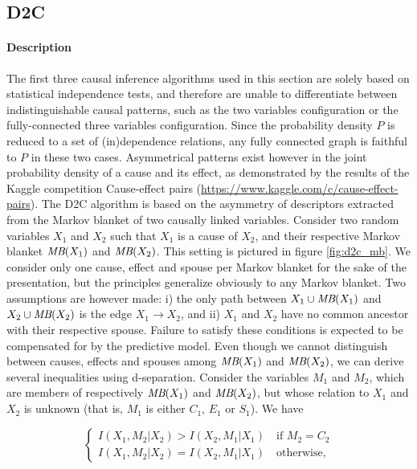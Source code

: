 \subsection{D2C}

\paragraph{Description} The first three causal inference algorithms used in this
section are solely based on statistical independence tests, and therefore are
unable to differentiate between indistinguishable causal patterns, such as the
two variables configuration or the fully-connected three variables
configuration. Since the probability density $P$ is reduced to a set of
(in)dependence relations, any fully connected graph is faithful to $P$ in these
two cases. Asymmetrical patterns exist however in the joint probability density
of a cause and its effect, as demonstrated by the results of the Kaggle
competition Cause-effect pairs
(\url{https://www.kaggle.com/c/cause-effect-pairs}). The D2C algorithm
\parencite{bontempi2015dependency} is based on the asymmetry of descriptors
extracted from the Markov blanket of two causally linked variables. Consider two
random variables $X_1$ and $X_2$ such that $X_1$ is a cause of $X_2$, and their
respective Markov blanket $\textit{MB}(X_1)$ and $\textit{MB}(X_2)$. This setting is pictured in
figure \ref{fig:d2c_mb}. We consider only one cause, effect and spouse per
Markov blanket for the sake of the presentation, but the principles generalize
obviously to any Markov blanket. Two assumptions are however made: i) the only
path between $X_1\cup\textit{MB}(X_1)$ and $X_2\cup\textit{MB}(X_2)$ is the edge $X_1\rightarrow
X_2$, and ii) $X_1$ and $X_2$ have no common ancestor with their respective
spouse. Failure to satisfy these conditions is expected to be compensated for
by the predictive model. Even though we cannot distinguish between causes,
effects and spouses among $\textit{MB}(X_1)$ and $\textit{MB}(X_2)$, we can derive several
inequalities using d-separation. Consider the variables $M_1$ and $M_2$, which
are members of respectively  $\textit{MB}(X_1)$ and $\textit{MB}(X_2)$, but whose relation to
$X_1$ and $X_2$ is unknown (that is, $M_1$ is either $C_1$, $E_1$ or $S_1$). We
have

\begin{equation}
\label{eq:d2c_ineq}
\begin{cases}
    I(X_1, M_2 | X_2) > I(X_2, M_1 | X_1)\quad\text{if }M_2 = C_2 \\
    I(X_1, M_2 | X_2) = I(X_2, M_1 | X_1)\quad\text{otherwise,}
\end{cases}
\end{equation}

